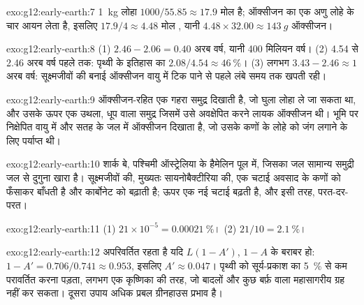\begin{solution}{exo:g12:early-earth:7}
\qty{1}{kg} लोहा $1000/55.85 \approx 17.9$ मोल है; ऑक्सीजन का एक
अणु लोहे के चार आयन लेता है, इसलिए $17.9/4 \approx 4.48$ मोल
, यानी $4.48 \times 32.00 \approx \qty{143}{g}$ ऑक्सीजन।
\end{solution}

\begin{solution}{exo:g12:early-earth:8}
(1) $2.46 - 2.06 = 0.40$ अरब वर्ष, यानी 400 मिलियन वर्ष। (2) 4.54
से 2.46 अरब वर्ष पहले तक: पृथ्वी के इतिहास का $2.08/4.54 \approx \qty{46}{\percent}$।
(3) लगभग $3.43 - 2.46 \approx 1$ अरब वर्ष: सूक्ष्मजीवों की बनाई
ऑक्सीजन वायु में टिक पाने से पहले लंबे समय तक खपती
रही।
\end{solution}

\begin{solution}{exo:g12:early-earth:9}
 ऑक्सीजन-रहित एक गहरा समुद्र दिखाती है, जो
घुला लोहा ले जा सकता था, और उसके ऊपर एक उथला, धूप वाला समुद्र जिसमें उसे अवक्षेपित करने लायक ऑक्सीजन थी।
भूमि पर निक्षेपित  वायु में और सतह के जल में ऑक्सीजन दिखाता है,
जो उसके कणों के लोहे को जंग लगाने के लिए पर्याप्त थी।
\end{solution}

\begin{solution}{exo:g12:early-earth:10}
शार्क बे, पश्चिमी ऑस्ट्रेलिया के हैमेलिन पूल में, जिसका जल सामान्य समुद्री जल से
दुगुना खारा है। सूक्ष्मजीवों की, मुख्यतः सायनोबैक्टीरिया की, एक चटाई अवसाद के कणों को फँसाकर
बाँधती है और कार्बोनेट को बढ़ाती है; ऊपर एक नई चटाई बढ़ती है,
और इसी तरह, परत-दर-परत।
\end{solution}

\begin{solution}{exo:g12:early-earth:11}
(1) $21 \times 10^{-5} = \qty{0.00021}{\percent}$। (2) $21/10 =
\qty{2.1}{\percent}$।
\end{solution}

\begin{solution}{exo:g12:early-earth:12}
 अपरिवर्तित रहता है यदि $L(1 - A')$, $1 - A$ के बराबर हो:
$1 - A' = 0.706/0.741 \approx 0.953$, इसलिए $A' \approx 0.047$। पृथ्वी को
सूर्य-प्रकाश का \qty{5}{\percent} से कम परावर्तित करना पड़ता, लगभग एक
कृष्णिका की तरह, जो बादलों और कुछ बर्फ़ वाला महासागरीय ग्रह नहीं कर सकता।
दूसरा उपाय अधिक प्रबल ग्रीनहाउस प्रभाव है।
\end{solution}

